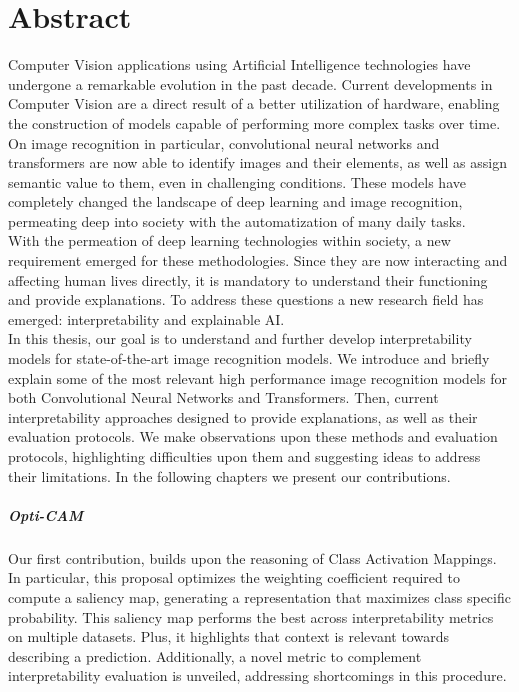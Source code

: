 \chapter*{Abstract}
Computer Vision applications using Artificial Intelligence technologies have undergone a remarkable 
evolution in the past decade. Current developments in Computer Vision are a direct result of a 
better utilization of hardware, enabling the construction of models capable of performing more 
complex tasks over time. On image recognition in particular, convolutional neural networks and 
transformers are now able to identify images and their elements, as well as assign semantic value 
to them, even in challenging conditions. These models have completely changed the landscape of deep 
learning and image recognition, permeating deep into society with the automatization of many daily 
tasks.\\

\noindent With the permeation of deep learning technologies within society, a new requirement 
emerged for these methodologies. Since they are now interacting and affecting human lives directly, 
it is mandatory to understand their functioning and provide explanations. To address these 
questions a new research field has emerged: interpretability and explainable AI.\\

\noindent In this thesis, our goal is to understand and further develop interpretability models for 
state-of-the-art image recognition models. We introduce and briefly explain some of the most 
relevant high performance image recognition models for both Convolutional Neural Networks 
and Transformers. Then, current interpretability approaches designed to provide 
explanations, as well as their evaluation protocols. We make observations upon 
these methods and evaluation protocols, highlighting difficulties upon them and suggesting ideas 
to address their limitations. In the following chapters we present our contributions.\\

\paragraph{Opti-CAM} Our first contribution, builds upon the reasoning of Class Activation 
Mappings. In particular, this proposal optimizes the weighting coefficient required to compute a 
saliency map, generating a representation that maximizes class specific probability.  This saliency 
map performs the best across interpretability metrics on multiple datasets.  Plus, it highlights 
that context is relevant towards describing a prediction. Additionally, a novel metric to complement 
interpretability evaluation is unveiled, addressing shortcomings in this procedure.\\


